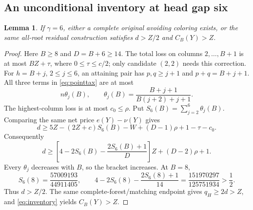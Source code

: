 \documentclass[11pt,a4paper]{article}
\newtheorem{lemma}[theorem]{Lemma}
\theoremstyle{definition}
\begin{document}
\subsection{An unconditional inventory at head gap six}
\begin{lemma}\label{lem:gap6}
If $\gamma=6$, either a complete original avoiding coloring exists, or the same all-root residual construction satisfies $d>Z/2$ and $C_B(Y)>Z$.
\end{lemma}
\begin{proof}
Here $B\ge8$ and $D=B+6\ge14$. The total loss on columns $2,\ldots,B+1$ is at most $BZ+\tau$, where $0\le\tau\le c/2$; only candidate $(2,2)$ needs this correction. For $h=B+j$, $2\le j\le6$, an attaining pair has $p,q\ge j+1$ and $p+q=B+j+1$. All three terms in \eqref{eq:pointtax} are at most
\[
n\theta_j(B),\qquad
\theta_j(B)=\frac{B+j+1}{B(j+2)+j+1}.
\]
The highest-column loss is at most $c_0\le\rho$. Put $S_6(B)=\sum_{j=2}^{6}\theta_j(B)$. Comparing the same net price $e(Y)-\nu(Y)$ gives
\[
d\ge5Z-(2Z+c)S_6(B)-W+(D-1)\rho+1-\tau-c_0.
\]
Consequently
\[
d\ge\left[4-2S_6(B)-\frac{2S_6(B)+1}{D}\right]Z
+(D-2)\rho+1.
\]
Every $\theta_j$ decreases with $B$, so the bracket increases. At $B=8$,
\[
S_6(8)=\frac{57009193}{44911405},\qquad
4-2S_6(8)-\frac{2S_6(8)+1}{14}
=\frac{151970297}{125751934}>\frac12.
\]
Thus $d>Z/2$. The same complete-forest/matching endpoint gives $q_H\ge2d>Z$, and \eqref{eq:inventory} yields $C_B(Y)>Z$.
\end{proof}
\end{document}
